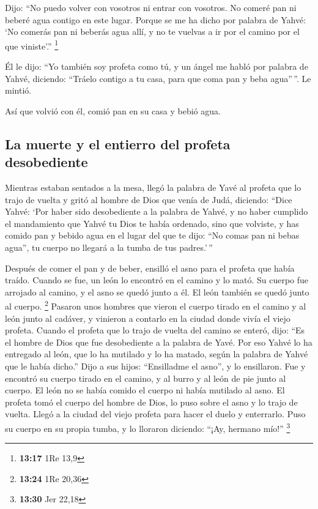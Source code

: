  Dijo: ``No puedo volver con vosotros ni entrar con
vosotros. No comeré pan ni beberé agua contigo en este lugar.
 Porque se me ha dicho por palabra de Yahvé: `No comerás
pan ni beberás agua allí, y no te vuelvas a ir por el camino por el que
viniste'.'' \footnote{\textbf{13:17} 1Re 13,9}

 Él le dijo: ``Yo también soy profeta como tú, y un ángel
me habló por palabra de Yahvé, diciendo: ``Tráelo contigo a tu casa,
para que coma pan y beba agua''\,''. Le mintió.

 Así que volvió con él, comió pan en su casa y bebió
agua.

\hypertarget{la-muerte-y-el-entierro-del-profeta-desobediente}{%
\subsection{La muerte y el entierro del profeta
desobediente}\label{la-muerte-y-el-entierro-del-profeta-desobediente}}

 Mientras estaban sentados a la mesa, llegó la palabra de
Yavé al profeta que lo trajo de vuelta  y gritó al hombre
de Dios que venía de Judá, diciendo: ``Dice Yahvé: `Por haber sido
desobediente a la palabra de Yahvé, y no haber cumplido el mandamiento
que Yahvé tu Dios te había ordenado,  sino que volviste,
y has comido pan y bebido agua en el lugar del que te dijo: ``No comas
pan ni bebas agua'', tu cuerpo no llegará a la tumba de tus padres.'\,''

 Después de comer el pan y de beber, ensilló el asno para
el profeta que había traído.  Cuando se fue, un león lo
encontró en el camino y lo mató. Su cuerpo fue arrojado al camino, y el
asno se quedó junto a él. El león también se quedó junto al cuerpo.
\footnote{\textbf{13:24} 1Re 20,36}  Pasaron unos hombres
que vieron el cuerpo tirado en el camino y al león junto al cadáver, y
vinieron a contarlo en la ciudad donde vivía el viejo profeta.
 Cuando el profeta que lo trajo de vuelta del camino se
enteró, dijo: ``Es el hombre de Dios que fue desobediente a la palabra
de Yavé. Por eso Yahvé lo ha entregado al león, que lo ha mutilado y lo
ha matado, según la palabra de Yahvé que le había dicho.''
 Dijo a sus hijos: ``Ensilladme el asno'', y lo
ensillaron.  Fue y encontró su cuerpo tirado en el
camino, y al burro y al león de pie junto al cuerpo. El león no se había
comido el cuerpo ni había mutilado al asno.  El profeta
tomó el cuerpo del hombre de Dios, lo puso sobre el asno y lo trajo de
vuelta. Llegó a la ciudad del viejo profeta para hacer el duelo y
enterrarlo.  Puso su cuerpo en su propia tumba, y lo
lloraron diciendo: ``¡Ay, hermano mío!'' \footnote{\textbf{13:30} Jer
  22,18}

